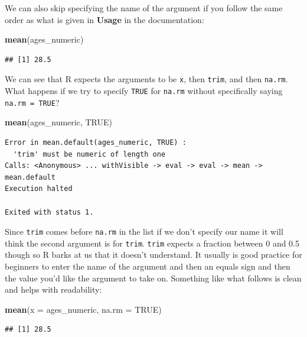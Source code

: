 \documentclass[]{tufte-book}
\newenvironment{Shaded}{\begin{snugshade}}{\end{snugshade}}
\newcommand{\KeywordTok}[1]{\textcolor[rgb]{0.13,0.29,0.53}{\textbf{{#1}}}}
\newcommand{\DataTypeTok}[1]{\textcolor[rgb]{0.13,0.29,0.53}{{#1}}}
\newcommand{\OtherTok}[1]{\textcolor[rgb]{0.56,0.35,0.01}{{#1}}}
\newcommand{\NormalTok}[1]{{#1}}
\theoremstyle{definition}
\theoremstyle{definition}
\theoremstyle{remark}
\begin{document}
We can also skip specifying the name of the argument if you follow the
same order as what is given in \textbf{Usage} in the documentation:

\begin{Shaded}
\begin{Highlighting}[]
\KeywordTok{mean}\NormalTok{(ages_numeric)}
\end{Highlighting}
\end{Shaded}

\begin{verbatim}
## [1] 28.5
\end{verbatim}

We can see that R expects the arguments to be \texttt{x}, then
\texttt{trim}, and then \texttt{na.rm}. What happens if we try to
specify \texttt{TRUE} for \texttt{na.rm} without specifically saying
\texttt{na.rm\ =\ TRUE}?

\begin{Shaded}
\begin{Highlighting}[]
\KeywordTok{mean}\NormalTok{(ages_numeric, }\OtherTok{TRUE}\NormalTok{)}
\end{Highlighting}
\end{Shaded}

\begin{verbatim}
Error in mean.default(ages_numeric, TRUE) : 
  'trim' must be numeric of length one
Calls: <Anonymous> ... withVisible -> eval -> eval -> mean -> mean.default
Execution halted

Exited with status 1.
\end{verbatim}

Since \texttt{trim} comes before \texttt{na.rm} in the list if we don't
specify our name it will think the second argument is for \texttt{trim}.
\texttt{trim} expects a fraction between 0 and 0.5 though so R barks at
us that it doesn't understand. It usually is good practice for beginners
to enter the name of the argument and then an equals sign and then the
value you'd like the argument to take on. Something like what follows is
clean and helps with readability:

\begin{Shaded}
\begin{Highlighting}[]
\KeywordTok{mean}\NormalTok{(}\DataTypeTok{x =} \NormalTok{ages_numeric, }\DataTypeTok{na.rm =} \OtherTok{TRUE}\NormalTok{)}
\end{Highlighting}
\end{Shaded}

\begin{verbatim}
## [1] 28.5
\end{verbatim}
\end{document}
